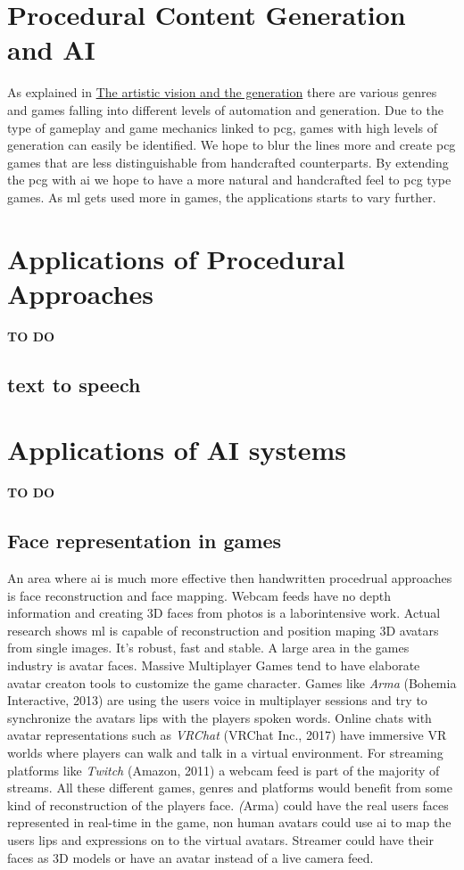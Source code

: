 \documentclass[10pt,a4paper]{article}
\begin{document}
\section{Procedural Content Generation and AI}
As explained in \hyperref[sec:visionVSgeneration]{The artistic vision and the generation} there are various genres and games falling into different levels of automation and generation. Due to the type of gameplay and game mechanics linked to \gls{pcg}, games with high levels of generation can easily be identified. We hope to blur the lines more and create \gls{pcg} games that are less distinguishable from handcrafted counterparts. By extending the \gls{pcg} with \gls{ai} we hope to have a more natural and handcrafted feel to \gls{pcg} type games. As \gls{ml} gets used more in games, the applications starts to vary further.

\section{Applications of Procedural Approaches}
\textbf{TO DO}

\subsection{text to speech}


\section{Applications of AI systems}
\textbf{TO DO}

\subsection{Face representation in games}
An area where \gls{ai} is much more effective then handwritten procedrual approaches is face reconstruction and face mapping. Webcam feeds have no depth information and creating 3D faces from photos is a laborintensive work. Actual research shows \gls{ml} is capable of reconstruction and position maping 3D avatars from single images. It's robust, fast and stable\cite{Feng2018}. A large area in the games industry is avatar faces. Massive Multiplayer Games tend to have elaborate avatar creaton tools to customize the game character. Games like \textit{Arma} (Bohemia Interactive, 2013) are using the users voice in multiplayer sessions and try to synchronize the avatars lips with the players spoken words. Online chats with avatar representations such as \textit{VRChat} (VRChat Inc., 2017) have immersive VR worlds where players can walk and talk in a virtual environment. For streaming platforms like \textit{Twitch} (Amazon, 2011) a webcam feed is part of the majority of streams. All these different games, genres and platforms would benefit from some kind of reconstruction of the players face. \textit(Arma) could have the real users faces represented in real-time in the game, non human avatars could use \gls{ai} to map the users lips and expressions on to the virtual avatars. Streamer could have their faces as 3D models or have an avatar instead of a live camera feed.
\end{document}
